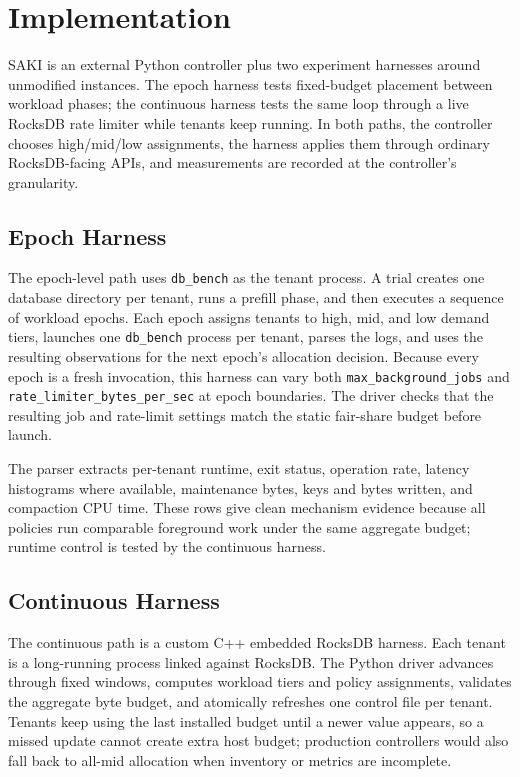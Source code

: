 \section{Implementation}
\label{sec:implementation}

SAKI is an external Python controller plus two experiment harnesses around
unmodified \rocksdb instances. The epoch harness tests fixed-budget placement
between workload phases; the continuous harness tests the same loop through a
live RocksDB rate limiter while tenants keep running. In both paths, the
controller chooses high/mid/low assignments, the harness applies them through
ordinary RocksDB-facing APIs, and measurements are recorded at the controller's
granularity.

\subsection{Epoch Harness}

The epoch-level path uses \texttt{db\_bench} as the tenant process. A trial
creates one database directory per tenant, runs a prefill phase, and then
executes a sequence of workload epochs. Each epoch assigns tenants to high,
mid, and low demand tiers, launches one \texttt{db\_bench} process per tenant,
parses the logs, and uses the resulting observations for the next epoch's
allocation decision. Because every epoch is a fresh invocation, this harness
can vary both \texttt{max\_background\_jobs} and
\texttt{rate\_limiter\_bytes\_per\_sec} at epoch boundaries. The driver checks
that the resulting job and rate-limit settings match the static fair-share
budget before launch.

The parser extracts per-tenant runtime, exit status, operation rate, latency
histograms where available, maintenance bytes, keys and bytes written, and
compaction CPU time. These rows give clean mechanism evidence because all
policies run comparable foreground work under the same aggregate budget; runtime
control is tested by the continuous harness.

\subsection{Continuous Harness}

The continuous path is a custom C++ embedded RocksDB harness. Each tenant is a
long-running process linked against RocksDB. The Python driver advances through
fixed windows, computes workload tiers and policy assignments, validates the
aggregate byte budget, and atomically refreshes one control file per tenant.
Tenants keep using the last installed budget until a newer value appears, so a
missed update cannot create extra host budget; production controllers would
also fall back to all-mid allocation when inventory or metrics are incomplete.

